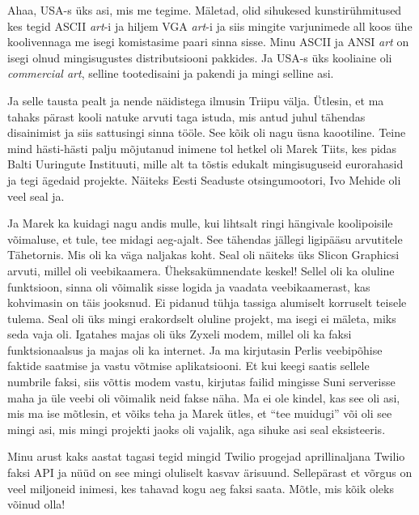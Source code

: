 Ahaa, USA-s üks asi, mis me tegime. Mäletad, olid sihukesed kunstirühmitused kes tegid ASCII \emph{art}-i ja hiljem VGA \emph{art}-i ja siis mingite varjunimede all koos ühe koolivennaga me isegi komistasime paari sinna sisse. Minu ASCII ja ANSI \emph{art} on isegi olnud mingisugustes distributsiooni pakkides. Ja USA-s üks kooliaine oli \emph{commercial art},  selline tootedisaini ja pakendi ja mingi selline asi. 

Ja selle tausta pealt ja nende näidistega ilmusin  Triipu välja. Ütlesin, et ma tahaks pärast kooli natuke arvuti taga istuda, mis antud juhul tähendas disainimist ja siis sattusingi sinna tööle.  See kõik oli nagu üsna kaootiline. Teine mind hästi-hästi palju mõjutanud inimene tol hetkel oli Marek Tiits,  kes pidas Balti Uuringute Instituuti, mille alt ta tõstis edukalt mingisuguseid eurorahasid ja tegi ägedaid projekte. Näiteks Eesti Seaduste otsingumootori, Ivo Mehide oli veel seal ja. 

Ja Marek ka kuidagi nagu andis mulle, kui lihtsalt  ringi hängivale koolipoisile võimaluse, et tule, tee midagi aeg-ajalt. See tähendas jällegi ligipääsu arvutitele Tähetornis. Mis oli ka väga naljakas koht. Seal oli näiteks üks Slicon Graphicsi arvuti, millel oli veebikaamera. Üheksakümnendate keskel! Sellel oli ka oluline funktsioon, sinna oli võimalik sisse logida ja vaadata veebikaamerast, kas kohvimasin on täis jooksnud. Ei pidanud tühja tassiga alumiselt korruselt teisele tulema. Seal oli üks mingi erakordselt oluline projekt, ma isegi  ei mäleta, miks seda vaja oli. Igatahes majas oli üks Zyxeli modem, millel oli ka faksi funktsionaalsus ja  majas oli ka internet.   Ja ma kirjutasin Perlis veebipõhise faktide saatmise ja vastu võtmise aplikatsiooni. Et kui keegi saatis sellele numbrile faksi, siis võttis modem vastu, kirjutas failid mingisse Suni serverisse maha ja üle veebi oli võimalik neid fakse näha. Ma ei ole kindel, kas see oli asi, mis ma ise mõtlesin, et võiks teha ja Marek ütles, et \enquote{tee muidugi} või oli see mingi asi, mis mingi projekti jaoks oli vajalik, aga sihuke asi seal eksisteeris.


Minu arust kaks aastat tagasi tegid mingid Twilio progejad aprillinaljana Twilio faksi API ja nüüd on see mingi oluliselt kasvav ärisuund. Sellepärast et võrgus on veel miljoneid inimesi, kes tahavad kogu aeg faksi saata. Mõtle, mis kõik oleks võinud olla! 

